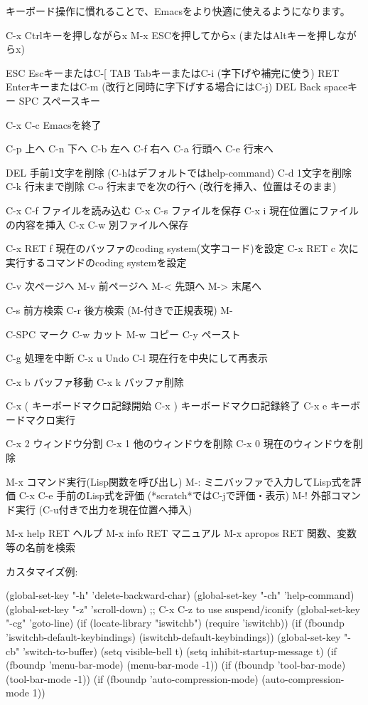 \documentclass[mingoth,a4paper]{jsarticle}
\begin{document}
キーボード操作に慣れることで、Emacsをより快適に使えるようになります。

\begin{commandline}
C-x     Ctrlキーを押しながらx
M-x     ESCを押してからx  (またはAltキーを押しながらx)

ESC     EscキーまたはC-[
TAB     TabキーまたはC-i (字下げや補完に使う)
RET     EnterキーまたはC-m (改行と同時に字下げする場合にはC-j)
DEL     Back spaceキー
SPC     スペースキー

C-x C-c         Emacsを終了

C-p  上へ       C-n  下へ
C-b  左へ       C-f  右へ
C-a  行頭へ     C-e  行末へ

DEL     手前1文字を削除 (C-hはデフォルトではhelp-command)
C-d     1文字を削除
C-k     行末まで削除
C-o     行末までを次の行へ (改行を挿入、位置はそのまま)

C-x C-f         ファイルを読み込む
C-x C-s         ファイルを保存
C-x i           現在位置にファイルの内容を挿入
C-x C-w         別ファイルへ保存

C-x RET f       現在のバッファのcoding system(文字コード)を設定
C-x RET c       次に実行するコマンドのcoding systemを設定

C-v 次ページへ  M-v 前ページへ
M-< 先頭へ      M-> 末尾へ

C-s  前方検索   C-r  後方検索  (M-付きで正規表現)
M-%

C-SPC マーク
C-w カット   M-w コピー   C-y ペースト

C-g     処理を中断
C-x u   Undo
C-l     現在行を中央にして再表示

C-x b バッファ移動   C-x k バッファ削除

C-x (   キーボードマクロ記録開始
C-x )   キーボードマクロ記録終了
C-x e   キーボードマクロ実行

C-x 2   ウィンドウ分割
C-x 1   他のウィンドウを削除
C-x 0   現在のウィンドウを削除

M-x     コマンド実行(Lisp関数を呼び出し)
M-:     ミニバッファで入力してLisp式を評価
C-x C-e 手前のLisp式を評価 (*scratch*ではC-jで評価・表示)
M-!     外部コマンド実行 (C-u付きで出力を現在位置へ挿入)

M-x help RET    ヘルプ
M-x info RET    マニュアル
M-x apropos RET 関数、変数等の名前を検索

\end{commandline}

カスタマイズ例:

\begin{commandline}
(global-set-key "\C-h" 'delete-backward-char)
(global-set-key "\C-ch" 'help-command)
(global-set-key "\C-z" 'scroll-down) ;; C-x C-z to use suspend/iconify
(global-set-key "\C-cg" 'goto-line)
(if (locate-library "iswitchb") (require 'iswitchb))
(if (fboundp 'iswitchb-default-keybindings) (iswitchb-default-keybindings))
(global-set-key "\C-cb" 'switch-to-buffer)
(setq visible-bell t)
(setq inhibit-startup-message t)
(if (fboundp 'menu-bar-mode) (menu-bar-mode -1))
(if (fboundp 'tool-bar-mode) (tool-bar-mode -1))
(if (fboundp 'auto-compression-mode) (auto-compression-mode 1))
\end{commandline}
\end{document}
